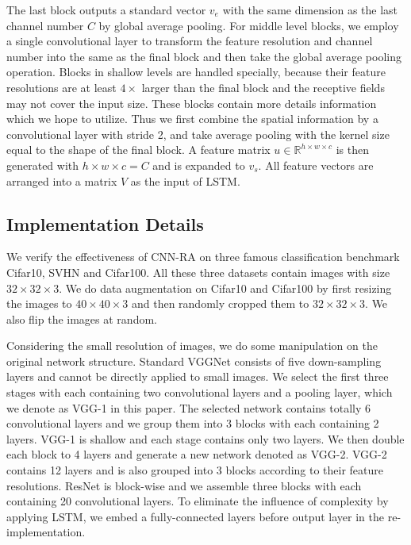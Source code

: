 \documentclass[conference]{IEEEtran}
\begin{document}
The last block outputs a standard vector $v_e$ with the same dimension as the last channel number $C$ by global average pooling. For middle level blocks, we employ a single convolutional layer to transform the feature resolution and channel number into the same as the final block and then take the global average pooling operation. Blocks in shallow levels are handled specially, because their feature resolutions are at least $4\times$ larger than the final block and the receptive fields may not cover the input size. These blocks contain more details information which we hope to utilize. Thus we first combine the spatial information by a convolutional layer with stride 2, and take average pooling with the kernel size equal to the shape of the final block. A feature matrix $u \in \mathbb{R}^{h\times w \times c}$ is then generated with $h\times w \times c = C$ and is expanded to $v_s$. All feature vectors are arranged into a matrix $V$ as the input of LSTM.

\subsection{Implementation Details}

We verify the effectiveness of CNN-RA on three famous classification benchmark Cifar10\cite{cifar}, SVHN\cite{SVHN} and Cifar100\cite{cifar}. All these three datasets contain images with size $32\times 32\times 3$. We do data augmentation on Cifar10 and Cifar100 by first resizing the images to $40\times 40\times 3$ and then randomly cropped them to $32\times 32\times 3$. We also flip the images at random.

Considering the small resolution of images, we do some manipulation on the original network structure. Standard VGGNet consists of five down-sampling layers and cannot be directly applied to small images. We select the first three stages with each containing two convolutional layers and a pooling layer, which we denote as VGG-1 in this paper. The selected network contains totally 6 convolutional layers and we group them into 3 blocks with each containing 2 layers. VGG-1 is shallow and each stage contains only two layers. We then double each block to 4 layers and generate a new network denoted as VGG-2. VGG-2 contains 12 layers and is also grouped into 3 blocks according to their feature resolutions. ResNet is block-wise and we assemble three blocks with each containing 20 convolutional layers. To eliminate the influence of complexity by applying LSTM, we embed a fully-connected layers before output layer in the re-implementation.
\end{document}
